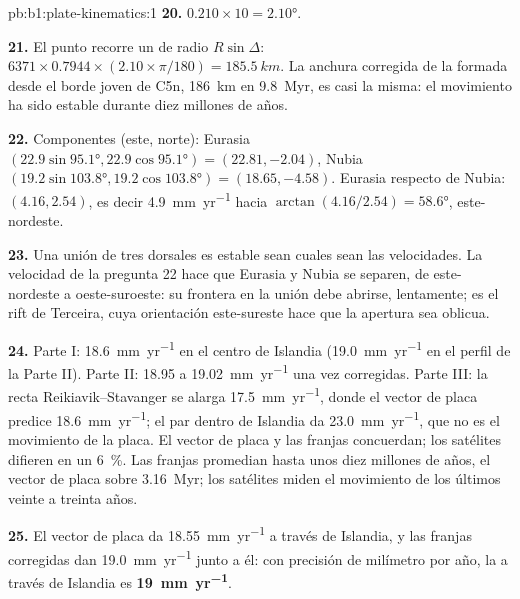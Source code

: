 \begin{solution}{pb:b1:plate-kinematics:1}
\textbf{20.} $0.210\times10 = \ang{2.10}$.

\textbf{21.} El punto recorre un  de radio $R\sin\Delta$:
$6371\times0.7944\times(2.10\times\pi/180) = \qty{185.5}{km}$. La anchura corregida de
la  formada desde el borde joven de C5n, \qty{186}{km} en
\qty{9.8}{Myr}, es casi la misma: el movimiento ha sido estable durante diez millones de años.

\textbf{22.} Componentes (este, norte): Eurasia
$(22.9\sin\ang{95.1}, 22.9\cos\ang{95.1}) = (22.81, -2.04)$, Nubia
$(19.2\sin\ang{103.8}, 19.2\cos\ang{103.8}) = (18.65, -4.58)$. Eurasia respecto
de Nubia: $(4.16, 2.54)$, es decir \qty{4.9}{mm.yr^{-1}} hacia
$\arctan(4.16/2.54) = \ang{58.6}$, este-nordeste.

\textbf{23.} Una unión de tres dorsales es estable sean cuales sean las velocidades. La
velocidad de la pregunta 22 hace que Eurasia y Nubia se separen, de este-nordeste a
oeste-suroeste: su frontera en la unión debe abrirse, lentamente; es el rift de Terceira,
cuya orientación este-sureste hace que la apertura sea oblicua.

\textbf{24.} Parte I: \qty{18.6}{mm.yr^{-1}} en el centro de Islandia
(\qty{19.0}{mm.yr^{-1}} en el perfil de la Parte II). Parte II: 18.95 a
\qty{19.02}{mm.yr^{-1}} una vez corregidas. Parte III: la recta Reikiavik--Stavanger
se alarga \qty{17.5}{mm.yr^{-1}}, donde el vector de placa predice
\qty{18.6}{mm.yr^{-1}}; el par dentro de Islandia da \qty{23.0}{mm.yr^{-1}},
que no es el movimiento de la placa. El vector de placa y las franjas concuerdan; los
satélites difieren en un \qty{6}{\percent}. Las franjas promedian hasta unos diez
millones de años, el vector de placa sobre \qty{3.16}{Myr}; los satélites miden el
movimiento de los últimos veinte a treinta años.

\textbf{25.} El vector de placa da \qty{18.55}{mm.yr^{-1}} a través de Islandia, y las
franjas corregidas dan \qty{19.0}{mm.yr^{-1}} junto a él: con precisión de milímetro por año,
la  a través de Islandia es
\textbf{\qty[text-series-to-math=true]{19}{mm.yr^{-1}}}.
\end{solution}
